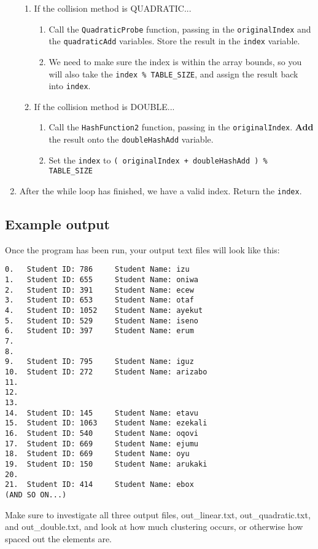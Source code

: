 \documentclass[a4paper,12pt,oneside]{book}
\begin{document}
\begin{enumerate}
\begin{enumerate}
        \item   If the collision method is QUADRATIC...
            \begin{enumerate}
                \item   Call the \texttt{QuadraticProbe} function,
                    passing in the \texttt{originalIndex} and the
                    \texttt{quadraticAdd} variables. Store the result in the
                    \texttt{index} variable.
                \item   We need to make sure the index is within the array
                    bounds, so you will also take the \texttt{index \% TABLE\_SIZE},
                    and assign the result back into \texttt{index}.
            \end{enumerate}
            
        
        \item   If the collision method is DOUBLE...
            \begin{enumerate}
                \item   Call the \texttt{HashFunction2} function, passing in
                    the \texttt{originalIndex}. \textbf{Add} the result
                    onto the \texttt{doubleHashAdd} variable.
                \item   Set the \texttt{index} to
                    \texttt{( originalIndex + doubleHashAdd ) \% TABLE\_SIZE}
            \end{enumerate}
            
    \end{enumerate}

    \item   After the while loop has finished, we have a valid index. Return the \texttt{index}.
    
\end{enumerate}

\hrulefill

\subsection{Example output}

Once the program has been run, your output text files will look like this:

\begin{lstlisting}[style=textfile]
0.   Student ID: 786 	 Student Name: izu
1.   Student ID: 655 	 Student Name: oniwa
2.   Student ID: 391 	 Student Name: ecew
3.   Student ID: 653 	 Student Name: otaf
4.   Student ID: 1052 	 Student Name: ayekut
5.   Student ID: 529 	 Student Name: iseno
6.   Student ID: 397 	 Student Name: erum
7.   
8.   
9.   Student ID: 795 	 Student Name: iguz
10.  Student ID: 272 	 Student Name: arizabo
11.  
12.  
13.  
14.  Student ID: 145 	 Student Name: etavu
15.  Student ID: 1063 	 Student Name: ezekali
16.  Student ID: 540 	 Student Name: oqovi
17.  Student ID: 669 	 Student Name: ejumu
18.  Student ID: 669 	 Student Name: oyu
19.  Student ID: 150 	 Student Name: arukaki
20.  
21.  Student ID: 414 	 Student Name: ebox
(AND SO ON...)
\end{lstlisting}

Make sure to investigate all three output files, out\_linear.txt,
out\_quadratic.txt, and out\_double.txt, and look at how much
clustering occurs, or otherwise how spaced out the elements are.
\end{document}
